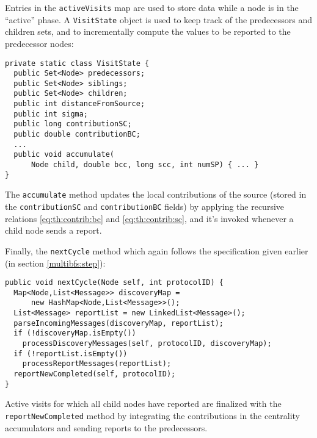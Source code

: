 Entries in the \texttt{activeVisits} map are used to store data while a node is in the ``active'' phase. A \texttt{VisitState} object is used to keep track of the predecessors and children sets, and to incrementally compute the values to be reported to the predecessor nodes:
\begin{verbatim}
private static class VisitState {
  public Set<Node> predecessors;
  public Set<Node> siblings;
  public Set<Node> children;
  public int distanceFromSource;
  public int sigma;
  public long contributionSC;
  public double contributionBC;
  ...	
  public void accumulate(
      Node child, double bcc, long scc, int numSP) { ... }
}
\end{verbatim}
The \texttt{accumulate} method updates the local contributions of the source (stored in the \texttt{contributionSC} and \texttt{contributionBC} fields) by applying the recursive relations \eqref{eq:th:contrib:bc} and \eqref{eq:th:contrib:sc}, and it's invoked whenever a child node sends a report.

Finally, the \texttt{nextCycle} method which again follows the specification given earlier (in section \ref{multibfs:step}):
\begin{verbatim}
public void nextCycle(Node self, int protocolID) {
  Map<Node,List<Message>> discoveryMap =
      new HashMap<Node,List<Message>>();
  List<Message> reportList = new LinkedList<Message>();
  parseIncomingMessages(discoveryMap, reportList);
  if (!discoveryMap.isEmpty())
    processDiscoveryMessages(self, protocolID, discoveryMap);
  if (!reportList.isEmpty())
    processReportMessages(reportList);
  reportNewCompleted(self, protocolID);
}
\end{verbatim}
Active visits for which all child nodes have reported are finalized with the \texttt{reportNewCompleted} method by integrating the contributions in the centrality accumulators and sending reports to the predecessors.